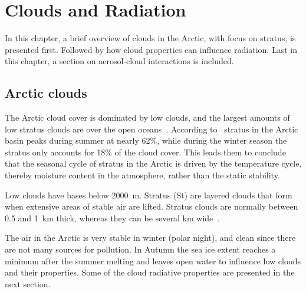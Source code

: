 \chapter{Clouds and Radiation}%
\label{chap:theory}
In this chapter, a brief overview of clouds in the Arctic, with focus on stratus, is presented first. Followed by how cloud properties can influence radiation. Last in this chapter, a section on aerosol-cloud interactions is included.


\section{Arctic clouds}%
The Arctic cloud cover is dominated by low clouds, and the largest amounts of low stratus clouds are over the open oceans~\citep{Klein1993}. %
 According to~\citet{Klein1993} stratus in the Arctic basin peaks during summer at nearly 62\%, while during the winter season the stratus only accounts for 18\% of the cloud cover. This leads them to conclude that the seasonal cycle of stratus in the Arctic is driven by the temperature cycle, thereby moisture content in the atmosphere, rather than the static stability.

Low clouds have bases below 2000~m. Stratus (St) are layered clouds that form when extensive areas of stable air are lifted. Stratus clouds are normally between 0.5 and 1~km thick, whereas they can be several km wide~\citep{Aguado2010}.

The air in the Arctic is very stable in winter (polar night), and clean since there are not many sources for pollution. In Autumn the sea ice extent reaches a minimum after the summer melting and leaves open water to influence low clouds and their properties.  Some of the cloud radiative properties are presented in the next section.

